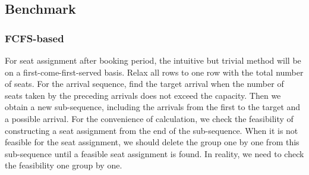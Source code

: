 










\subsection{Benchmark}
 

\subsubsection{FCFS-based}\label{FCFS-based}
For seat assignment after booking period, the intuitive but trivial method will be on a first-come-first-served basis. Relax all rows to one row with the total number of seats. For the arrival sequence, find the target arrival when the number of seats taken by the preceding arrivals does not exceed the capacity. 
Then we obtain a new sub-sequence, including the arrivals from the first to the target and a possible arrival. For the convenience of calculation, we check the feasibility of constructing a seat assignment from the end of the sub-sequence. When it is not feasible for the seat assignment, we should delete the group one by one from this sub-sequence until a feasible seat assignment is found. In reality, we need to check the feasibility one group by one. 

